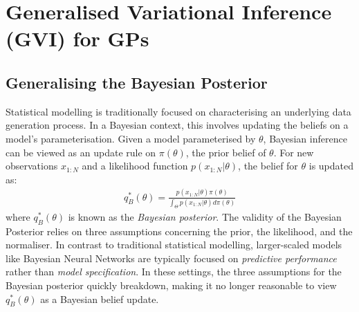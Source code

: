 \documentclass{article}
\numberwithin{equation}{section}
\begin{document}
\section{Generalised Variational Inference (GVI) for GPs}
\subsection{Generalising the Bayesian Posterior}
Statistical modelling is traditionally focused on characterising an underlying data generation process. In a Bayesian context, this involves updating the beliefs on a model's parameterisation. Given a model parameterised by $\theta$, Bayesian inference can be viewed as an update rule on $\pi(\theta)$, the prior belief of $\theta$. For new observations $x_{1:N}$ and a likelihood function $p(x_{1:N}|\theta)$, the belief for $\theta$ is updated as:
\begin{align}
q_B^*(\theta) = \frac{p(x_{1:N}|\theta) \pi(\theta)}{\int_{\Theta} p(x_{1:N}|\theta) d \pi(\theta)}
\label{bayesian-posterior}
\end{align}
where $q_B^*(\theta)$ is known as the \textit{Bayesian posterior}. The validity of the Bayesian Posterior relies on three assumptions concerning the prior, the likelihood, and the normaliser. In contrast to traditional statistical modelling, larger-scaled models like Bayesian Neural Networks are typically focused on \textit{predictive performance} rather than \textit{model specification}. In these settings, the three  assumptions for the Bayesian posterior quickly breakdown, making it no longer reasonable to view $q_B^*(\theta)$ as a Bayesian belief update.
\end{document}
